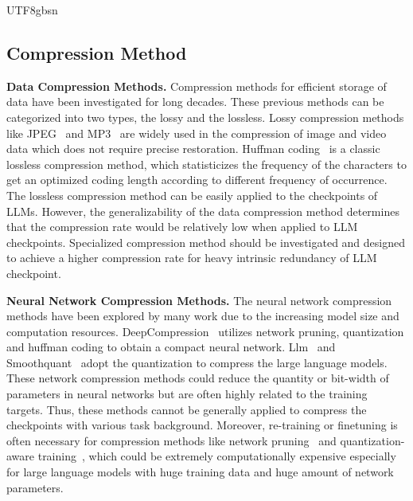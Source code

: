 \documentclass{article}
\theoremstyle{plain}
\theoremstyle{definition}
\theoremstyle{remark}
\begin{document}
\begin{CJK}{UTF8}{gbsn}
\subsection{Compression Method}
\noindent\textbf{Data Compression Methods.}
Compression methods for efficient storage of data have been investigated for long decades.  These previous methods can be categorized into two types, the lossy and the lossless. Lossy compression methods like JPEG~\cite{coding_techniques} and MP3~\cite{mp3} are widely used in the compression of image and video data which does not require precise restoration. Huffman coding~\cite{huffman_coding} is a classic lossless compression method, which statisticizes the frequency of the characters to get an optimized coding length according to different frequency of occurrence. The lossless compression method can be easily applied to the checkpoints of LLMs. However, the generalizability of the data compression method determines that the compression rate would be relatively low when applied to LLM checkpoints. Specialized compression method should be investigated and designed to achieve a higher compression rate for heavy intrinsic redundancy of LLM checkpoint.  

\noindent\textbf{Neural Network Compression Methods.}
The neural network compression methods have been explored by many work due to the increasing model size and computation resources. DeepCompression~\cite{han2015deep} utilizes network pruning, quantization and huffman coding to obtain a compact neural network. Llm~\cite{dettmers2022llm} and Smoothquant~\cite{xiao2023smoothquant} adopt the quantization to compress the large language models. These network compression methods could reduce the quantity or bit-width of parameters in neural networks but are often highly related to the training targets. Thus, these methods cannot be generally applied to compress the checkpoints with various task background. Moreover, re-training or finetuning is often necessary for compression methods like network pruning~\cite{networkslimming} and quantization-aware training~\cite{qat}, which could be extremely computationally expensive especially for large language models with huge training data and huge amount of network parameters.  


\end{CJK}
\end{document}
